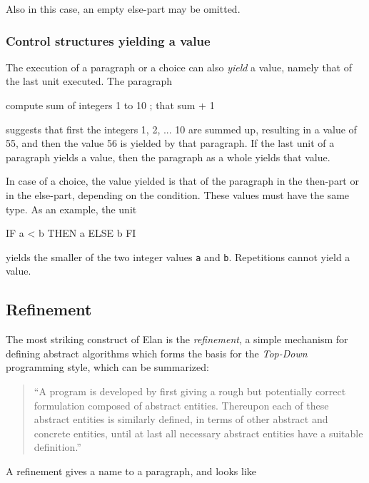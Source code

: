 \noindent
Also in this case, an empty else-part may be omitted.

\subsubsection{Control structures yielding a value}

The execution of a paragraph or a choice can also {\em yield}
a value, namely that of the last unit executed. The paragraph

\begin{elan}
        compute sum of integers 1 to 10 ;
        that sum + 1
\end{elan}

\noindent
suggests that first the integers 1, 2, ... 10 are summed up,
resulting in a value of 55, and then the value 56 is yielded
by that paragraph. If the last unit of a paragraph yields a value,
then the paragraph as a whole yields that value.

In case of a choice, the value yielded is that of the paragraph
in the then-part or in the else-part, depending on the condition.
These values must have the same type. As an example, the unit

\begin{elan}
        IF a < b THEN a ELSE b FI
\end{elan}

\noindent
yields the smaller of the two integer values {\tt a} and {\tt b}.
Repetitions cannot yield a value.

\subsection{Refinement}

The most striking construct of Elan is the {\em refinement},
a simple mechanism for defining abstract algorithms which forms
the basis for the {\em Top-Down} programming style, which can be summarized:

\begin{quote}
   ``A program is developed by first giving a rough but potentially
   correct formulation composed of abstract entities. Thereupon
   each of these abstract entities is similarly defined, in terms
   of other abstract and concrete entities, until at last all
   necessary abstract entities have a suitable definition.''
\end{quote}

\noindent
A refinement gives a name to a paragraph, and looks like

